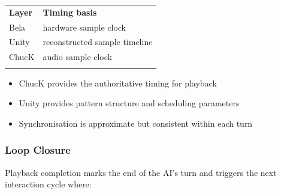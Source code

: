 {\def\LTcaptype{none} %
\begin{longtable}[]{@{}
  >{\raggedright\arraybackslash}p{}
  >{\raggedright\arraybackslash}p{}@{}}
\toprule\noalign{}
\begin{minipage}[b]{\linewidth}\centering
\textbf{Layer}
\end{minipage} & \begin{minipage}[b]{\linewidth}\centering
\textbf{Timing basis}
\end{minipage} \\
\begin{minipage}[b]{\linewidth}\raggedright
Bela
\end{minipage} & \begin{minipage}[b]{\linewidth}\raggedright
hardware sample clock
\end{minipage} \\
\begin{minipage}[b]{\linewidth}\raggedright
Unity
\end{minipage} & \begin{minipage}[b]{\linewidth}\raggedright
reconstructed sample timeline
\end{minipage} \\
\begin{minipage}[b]{\linewidth}\raggedright
ChucK
\end{minipage} & \begin{minipage}[b]{\linewidth}\raggedright
audio sample clock
\end{minipage} \\
\midrule\noalign{}
\endhead
\bottomrule\noalign{}
\endlastfoot
\end{longtable}
}

\begin{itemize}
\item
  ChucK provides the authoritative timing for playback
\item
  Unity provides pattern structure and scheduling parameters
\item
  Synchronisation is approximate but consistent within each turn
\end{itemize}

\subsubsection{Loop Closure}\label{loop-closure}

Playback completion marks the end of the AI's turn and triggers the next
interaction cycle where:

